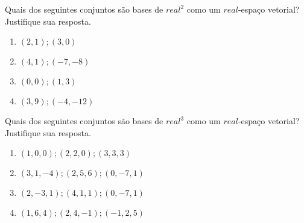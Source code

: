 \documentclass[12pt]{exam}
\begin{document}
    \begin{exercicio}
        Quais dos seguintes conjuntos são bases de $real^2$ como um $real$-espaço vetorial? Justifique sua resposta.
        \begin{multicols}{2}
            \begin{enumerate}[label={\alph*})]
                \item ${(2, 1); (3, 0)}$
            
                \item ${(4, 1); (-7, -8)}$
            
                \item ${(0, 0); (1, 3)}$
            
                \item ${(3, 9); (-4, -12)}$
            \end{enumerate}
        \end{multicols}
    \end{exercicio}

    \begin{exercicio}
        Quais dos seguintes conjuntos são bases de $real^3$ como um $real$-espaço vetorial? Justifique sua resposta.
        \begin{multicols}{2}
            \begin{enumerate}[label={\alph*})]
                \item ${(1, 0, 0); (2, 2, 0); (3, 3, 3)}$
            
                \item ${(3, 1, -4); (2, 5, 6); (0, -7, 1)}$
            
                \item ${(2, -3, 1); (4, 1, 1); (0, -7, 1)}$
            
                \item ${(1, 6, 4); (2, 4, -1); (-1, 2, 5)}$
            \end{enumerate}
        \end{multicols}
    \end{exercicio}
\end{document}
